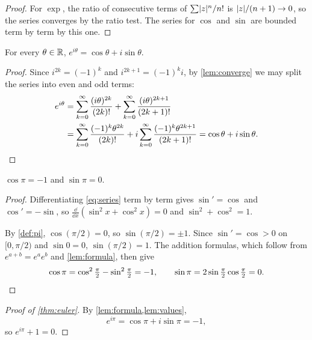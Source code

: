 \documentclass[11pt,a4paper]{article}
\begin{document}
\begin{proof}
  For $\exp$, the ratio of consecutive terms of $\sum \lvert z\rvert^n / n!$ is
  $\lvert z\rvert / (n+1) \to 0$, so the series converges by the ratio test. The
  series for $\cos$ and $\sin$ are bounded term by term by this one.
\end{proof}

\begin{lemma}\label{lem:formula}
  For every $\theta \in \mathbb{R}$, $e^{i\theta} = \cos\theta + i \sin\theta$.
\end{lemma}

\begin{proof}
  Since $i^{2k} = (-1)^k$ and $i^{2k+1} = (-1)^k i$, by \cref{lem:converge} we
  may split the series into even and odd terms:
  \begin{align*}
    e^{i\theta}
    &= \sum_{k=0}^{\infty} \frac{(i\theta)^{2k}}{(2k)!}
     + \sum_{k=0}^{\infty} \frac{(i\theta)^{2k+1}}{(2k+1)!} \\
    &= \sum_{k=0}^{\infty} \frac{(-1)^k \theta^{2k}}{(2k)!}
     + i \sum_{k=0}^{\infty} \frac{(-1)^k \theta^{2k+1}}{(2k+1)!}
     = \cos\theta + i \sin\theta. \qedhere
  \end{align*}
\end{proof}

\begin{lemma}[Values at $\pi$]\label{lem:values}
  $\cos\pi = -1$ and $\sin\pi = 0$.
\end{lemma}

\begin{proof}
  Differentiating \eqref{eq:series} term by term gives $\sin' = \cos$ and
  $\cos' = -\sin$, so $\frac{\dd}{\dd x}(\sin^2 x + \cos^2 x) = 0$ and
  $\sin^2 + \cos^2 = 1$.

  By \cref{def:pi}, $\cos(\pi/2) = 0$, so $\sin(\pi/2) = \pm 1$. Since
  $\sin' = \cos > 0$ on $[0, \pi/2)$ and $\sin 0 = 0$, $\sin(\pi/2) = 1$. The
  addition formulas, which follow from $e^{a+b} = e^a e^b$ and
  \cref{lem:formula}, then give
  \[
    \cos\pi = \cos^2\tfrac{\pi}{2} - \sin^2\tfrac{\pi}{2} = -1, \qquad
    \sin\pi = 2 \sin\tfrac{\pi}{2} \cos\tfrac{\pi}{2} = 0. \qedhere
  \]
\end{proof}

\begin{proof}[Proof of \cref{thm:euler}]
  By \cref{lem:formula,lem:values},
  \[
    e^{i\pi} = \cos\pi + i \sin\pi = -1,
  \]
  so $e^{i\pi} + 1 = 0$.
\end{proof}
\end{document}

